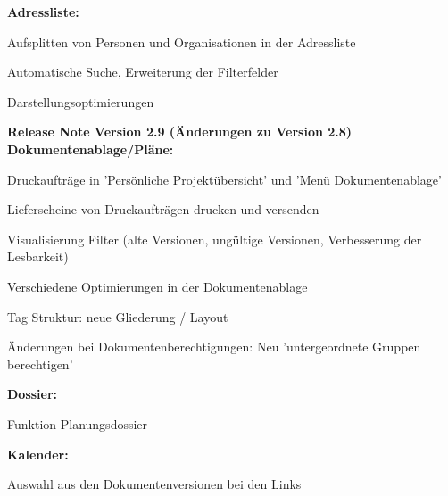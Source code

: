 \textbf{Adressliste:}
\begin{compactitem}
	\item Aufsplitten von Personen und Organisationen in der Adressliste
	\item Automatische Suche, Erweiterung der Filterfelder
	\item Darstellungsoptimierungen
\end{compactitem}

\vspace{\baselineskip}

\textbf{Release Note Version 2.9 (Änderungen zu Version 2.8)} \\
\textbf{Dokumentenablage/Pläne:}
\begin{compactitem}
	\item Druckaufträge in 'Persönliche Projektübersicht' und 'Menü Dokumentenablage' 
	\item Lieferscheine von Druckaufträgen drucken und versenden
	\item Visualisierung Filter (alte Versionen, ungültige Versionen, Verbesserung der Lesbarkeit)
	\item Verschiedene Optimierungen in der Dokumentenablage
	\item Tag Struktur: neue Gliederung / Layout
	\item Änderungen bei Dokumentenberechtigungen: Neu 'untergeordnete Gruppen berechtigen'
\end{compactitem}
\textbf{Dossier:}
\begin{compactitem}
	\item Funktion Planungsdossier 
\end{compactitem}
\textbf{Kalender:}
\begin{compactitem}
	\item Auswahl aus den Dokumentenversionen bei den Links 
\end{compactitem}

\vspace{\baselineskip}

